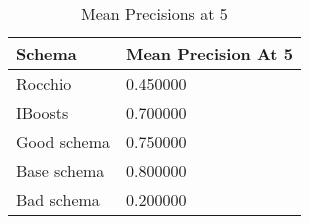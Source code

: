 

\begingroup
    \renewcommand{\arraystretch}{2} %
    \begin{table}[]
        \centering
        \begin{tabular}{ l | l }
            Schema & Mean Precision At 5 \\
            \hline
            Rocchio &  0.450000 \\
            IBoosts & 0.700000 \\
            Good schema & 0.750000 \\
            Base schema & 0.800000 \\
            Bad schema & 0.200000 \\
        \end{tabular}
        \caption{Mean Precisions at 5}
        \label{tab:mp5-2}
    \end{table}
\endgroup